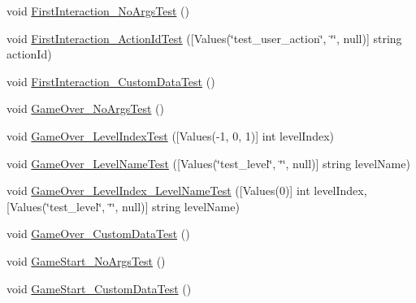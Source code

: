 \begin{DoxyCompactItemize}
\item 
void \mbox{\hyperlink{class_unity_engine_1_1_analytics_1_1_tests_1_1_analytics_event_tests_ac1e723538e90a9231caff88116f5c3ea}{First\+Interaction\+\_\+\+No\+Args\+Test}} ()
\item 
void \mbox{\hyperlink{class_unity_engine_1_1_analytics_1_1_tests_1_1_analytics_event_tests_acec82124562fd5e010344f8322626a31}{First\+Interaction\+\_\+\+Action\+Id\+Test}} (\mbox{[}Values(\char`\"{}test\+\_\+user\+\_\+action\char`\"{}, \char`\"{}\char`\"{}, null)\mbox{]} string action\+Id)
\item 
void \mbox{\hyperlink{class_unity_engine_1_1_analytics_1_1_tests_1_1_analytics_event_tests_abd60adc5f7ab708d272014c9d5506f57}{First\+Interaction\+\_\+\+Custom\+Data\+Test}} ()
\item 
void \mbox{\hyperlink{class_unity_engine_1_1_analytics_1_1_tests_1_1_analytics_event_tests_af656ea0f6a7e46b653cf302157c40136}{Game\+Over\+\_\+\+No\+Args\+Test}} ()
\item 
void \mbox{\hyperlink{class_unity_engine_1_1_analytics_1_1_tests_1_1_analytics_event_tests_a3444425a49cf013994c7ce2b554edf29}{Game\+Over\+\_\+\+Level\+Index\+Test}} (\mbox{[}Values(-\/1, 0, 1)\mbox{]} int level\+Index)
\item 
void \mbox{\hyperlink{class_unity_engine_1_1_analytics_1_1_tests_1_1_analytics_event_tests_a873f1317293e14c4afe9956134a6b450}{Game\+Over\+\_\+\+Level\+Name\+Test}} (\mbox{[}Values(\char`\"{}test\+\_\+level\char`\"{}, \char`\"{}\char`\"{}, null)\mbox{]} string level\+Name)
\item 
void \mbox{\hyperlink{class_unity_engine_1_1_analytics_1_1_tests_1_1_analytics_event_tests_a8bc52c76d2de9d4850e89418512b79ad}{Game\+Over\+\_\+\+Level\+Index\+\_\+\+Level\+Name\+Test}} (\mbox{[}Values(0)\mbox{]} int level\+Index, \mbox{[}Values(\char`\"{}test\+\_\+level\char`\"{}, \char`\"{}\char`\"{}, null)\mbox{]} string level\+Name)
\item 
void \mbox{\hyperlink{class_unity_engine_1_1_analytics_1_1_tests_1_1_analytics_event_tests_aa27f69ff00f8c401b343e47d0e478c77}{Game\+Over\+\_\+\+Custom\+Data\+Test}} ()
\item 
void \mbox{\hyperlink{class_unity_engine_1_1_analytics_1_1_tests_1_1_analytics_event_tests_a042ad12c1fad129357b76385afcf6d38}{Game\+Start\+\_\+\+No\+Args\+Test}} ()
\item 
void \mbox{\hyperlink{class_unity_engine_1_1_analytics_1_1_tests_1_1_analytics_event_tests_af6e446238bb2ffce3d2b564381e9b5b2}{Game\+Start\+\_\+\+Custom\+Data\+Test}} ()

\end{DoxyCompactItemize}
